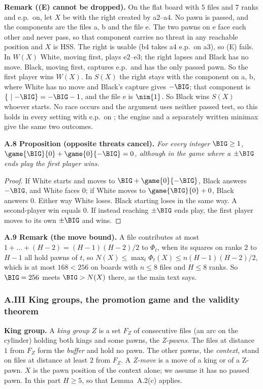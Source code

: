 \textbf{Remark ((E) cannot be dropped).} On the flat board with $5$ files and $7$ ranks and e.p.\ on, let $X$ be
 with the right created by a2--a4. No pawn is passed, and the components are the files a, b
and the file e. The two pawns on e face each other and never pass, so that component carries no threat in any reachable
position and $X$ is HSS. The right is usable (b4 takes a4 e.p.\ on a3), so (E) fails. In $W(X)$ White, moving first, plays
e2--e3; the right lapses and Black has no move. Black, moving first, captures e.p.\ and has the only passed pawn. So the
first player wins $W(X)$. In $S(X)$ the right stays with the component on a, b, where White has no move and Black's
capture gives $-\BIG$; that component is $\{\ \mid-\BIG\}=-\BIG-1$, and the file e is $\nim{1}$. So Black wins $S(X)$
whoever starts. No race occurs and the argument uses neither passed test, so this holds in every setting with e.p.\ on
; the engine and a separately written minimax give the same two outcomes.

\textbf{A.8 Proposition (opposite threats cancel).} \emph{For every integer $\BIG\ge1$,
$\game{\BIG}{0}+\game{0}{-\BIG}=0$, although in the game where a $\pm\BIG$ ends play the first player wins.}

\begin{proof}
If White starts and moves to $\BIG+\game{0}{-\BIG}$, Black answers $-\BIG$, and White faces $0$; if White moves to
$\game{\BIG}{0}+0$, Black answers $0$. Either way White loses. Black starting loses in the same way. A second-player win
equals $0$. If instead reaching $\pm\BIG$ ends play, the first player moves to its own $\pm\BIG$ and wins.
\end{proof}

\textbf{A.9 Remark (the move bound).} A file contributes at most $1+\dots+(H-2)=(H-1)(H-2)/2$ to $\Phi_t$, when its squares on ranks $2$ to $H-1$ all hold pawns of $t$, so
$N(X)\le\max_t\Phi_t(X)\le n(H-1)(H-2)/2$, which is at most $168<256$ on boards with $n\le8$ files and $H\le8$ ranks. So $\BIG=256$ meets
$\BIG>N(X)$ there, as the main text says.

\subsubsection*{A.III King groups, the promotion game and the validity theorem}

\textbf{King group.} A \emph{king group} $Z$ is a set $F_Z$ of consecutive files (an arc on the cylinder) holding both
kings and some pawns, the \emph{Z-pawns}. The files at distance $1$ from $F_Z$ form the \emph{buffer} and hold no pawn.
The other pawns, the \emph{context}, stand on files at distance at least $2$ from $F_Z$. A \emph{Z-move} is a move of a
king or of a Z-pawn. $X$ is the pawn position of the context alone; we assume it has no passed pawn. In this part $H\ge5$, so that Lemma~A.2(c) applies.

